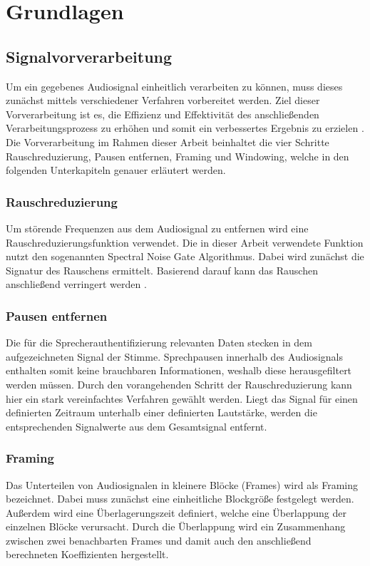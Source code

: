 \section{Grundlagen}\label{sec:Grundlagen}

\subsection{Signalvorverarbeitung}
Um ein gegebenes Audiosignal einheitlich verarbeiten zu können, muss dieses zunächst mittels verschiedener Verfahren vorbereitet werden.
Ziel dieser Vorverarbeitung ist es, die Effizienz und Effektivität des anschließenden Verarbeitungsprozess zu erhöhen und somit ein verbessertes Ergebnis zu erzielen \autocite[vgl.][S. 11672]{lokesh_speech_2019}.
Die Vorverarbeitung im Rahmen dieser Arbeit beinhaltet die vier Schritte Rauschreduzierung, Pausen entfernen, Framing und Windowing, welche in den folgenden Unterkapiteln genauer erläutert werden.

\subsubsection{Rauschreduzierung}
Um störende Frequenzen aus dem Audiosignal zu entfernen wird eine Rauschreduzierungsfunktion verwendet.
Die in dieser Arbeit verwendete Funktion nutzt den sogenannten Spectral Noise Gate Algorithmus.
Dabei wird zunächst die Signatur des Rauschens ermittelt.
Basierend darauf kann das Rauschen anschließend verringert werden \autocite[vgl.][S. 25]{kiapuchinski_spectral_2012}.

\subsubsection{Pausen entfernen}
Die für die Sprecherauthentifizierung relevanten Daten stecken in dem aufgezeichneten Signal der Stimme.
Sprechpausen innerhalb des Audiosignals enthalten somit keine brauchbaren Informationen, weshalb diese herausgefiltert werden müssen.
Durch den vorangehenden Schritt der Rauschreduzierung kann hier ein stark vereinfachtes Verfahren gewählt werden.
Liegt das Signal für einen definierten Zeitraum unterhalb einer definierten Lautstärke, werden die entsprechenden Signalwerte aus dem Gesamtsignal entfernt.

\subsubsection{Framing}
Das Unterteilen von Audiosignalen in kleinere Blöcke (Frames) wird als Framing bezeichnet.
Dabei muss zunächst eine einheitliche Blockgröße festgelegt werden.
Außerdem wird eine Überlagerungszeit definiert, welche eine Überlappung der einzelnen Blöcke verursacht.
Durch die Überlappung wird ein Zusammenhang zwischen zwei benachbarten Frames und damit auch den anschließend berechneten Koeffizienten hergestellt.

